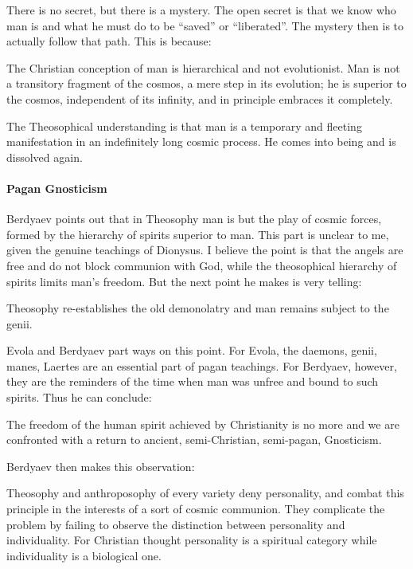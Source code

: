There is no secret, but there is a mystery. The open secret is that we know who man is and what he must do to be ``saved'' or ``liberated''. The mystery then is to actually follow that path. This is because:

\begin{quotex}
The Christian conception of man is hierarchical and not evolutionist. Man is not a transitory fragment of the cosmos, a mere step in its evolution; he is superior to the cosmos, independent of its infinity, and in principle embraces it completely.
\end{quotex}


The Theosophical understanding is that man is a temporary and fleeting manifestation in an indefinitely long cosmic process. He comes into being and is dissolved again.

\paragraph{Pagan Gnosticism}


Berdyaev points out that in Theosophy man is but the play of cosmic forces, formed by the hierarchy of spirits superior to man. This part is unclear to me, given the genuine teachings of Dionysus. I believe the point is that the angels are free and do not block communion with God, while the theosophical hierarchy of spirits limits man's freedom. But the next point he makes is very telling:

\begin{quotex}
Theosophy re-establishes the old demonolatry and man remains subject to the genii.
\end{quotex}


Evola and Berdyaev part ways on this point. For Evola, the daemons, genii, manes, Laertes are an essential part of pagan teachings. For Berdyaev, however, they are the reminders of the time when man was unfree and bound to such spirits. Thus he can conclude:

\begin{quotex}
The freedom of the human spirit achieved by Christianity is no more and we are confronted with a return to ancient, semi-Christian, semi-pagan, Gnosticism.
\end{quotex}


Berdyaev then makes this observation:

\begin{quotex}
Theosophy and anthroposophy of every variety deny personality, and combat this principle in the interests of a sort of cosmic communion. They complicate the problem by failing to observe the distinction between personality and individuality. For Christian thought personality is a spiritual category while individuality is a biological one.
\end{quotex}


